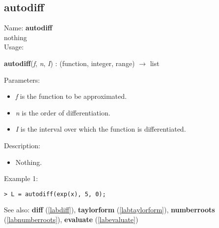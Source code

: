 \subsection{autodiff}
\label{labautodiff}
\noindent Name: \textbf{autodiff}\\
nothing\\
\noindent Usage: 
\begin{center}
\textbf{autodiff}(\emph{f}, \emph{n}, \emph{I}) : (\textsf{function}, \textsf{integer}, \textsf{range}) $\rightarrow$ \textsf{list}\\
\end{center}
Parameters: 
\begin{itemize}
\item \emph{f} is the function to be approximated.
\item \emph{n} is the order of differentiation.
\item \emph{I} is the interval over which the function is differentiated.
\end{itemize}
\noindent Description: \begin{itemize}

\item Nothing.
\end{itemize}
\noindent Example 1: 
\begin{center}\begin{minipage}{15cm}\begin{Verbatim}[frame=single]
> L = autodiff(exp(x), 5, 0);
\end{Verbatim}
\end{minipage}\end{center}
See also: \textbf{diff} (\ref{labdiff}), \textbf{taylorform} (\ref{labtaylorform}), \textbf{numberroots} (\ref{labnumberroots}), \textbf{evaluate} (\ref{labevaluate})

